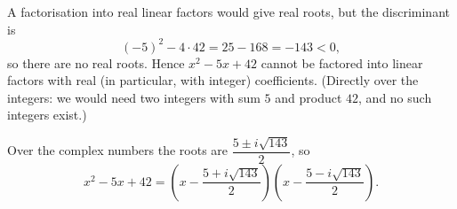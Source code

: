 A factorisation into real linear factors would give real roots, but the discriminant is
\[
(-5)^2-4\cdot42=25-168=-143<0,
\]
so there are no real roots. Hence $x^2-5x+42$ cannot be factored into linear factors with real (in particular, with integer) coefficients. (Directly over the integers: we would need two integers with sum $5$ and product $42$, and no such integers exist.)

Over the complex numbers the roots are $\dfrac{5\pm i\sqrt{143}}{2}$, so
\[
x^2-5x+42=\boxed{\left(x-\dfrac{5+i\sqrt{143}}{2}\right)\left(x-\dfrac{5-i\sqrt{143}}{2}\right)}.
\]
